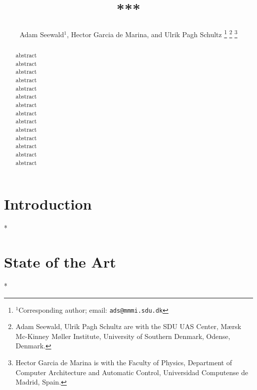 \documentclass[letterpaper,10pt,conference]{ieeeconf}
\title{\LARGE \bf
***
}
\author{
  Adam Seewald$^{1}$, Hector Garcia de Marina, and Ulrik Pagh Schultz
  \thanks{$^{1}$Corresponding author; email: {\tt\small ads@mmmi.sdu.dk}}
  \thanks{Adam Seewald, Ulrik Pagh Schultz are with the SDU UAS Center, M{\ae}rsk Mc-Kinney M{\o}ller Institute, University of Southern Denmark, Odense, Denmark.}
  \thanks{Hector Garcia de Marina is with the Faculty of Physics, Department of Computer Architecture and Automatic Control, Universidad Computense de Madrid, Spain.}
}
\begin{document}
\maketitle

\thispagestyle{empty}
\pagestyle{empty}

\begin{abstract}

  abstract\\
  abstract\\
  abstract\\
  abstract\\
  abstract\\
  abstract\\
  abstract\\
  abstract\\
  abstract\\
  abstract\\
  abstract\\
  abstract\\
  abstract\\
  abstract
\end{abstract}

%
\IEEEpeerreviewmaketitle

\section{Introduction}

*

\section{State of the Art}
\label{sec:related}

*
\end{document}
